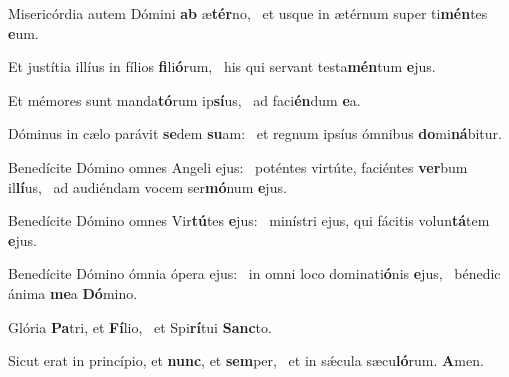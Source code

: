 \item Misericórdia autem Dómini \textbf{ab} æ\textbf{tér}no,~\psstar{} et usque in ætérnum super ti\textbf{mén}tes \textbf{e}um.
\item Et justítia illíus in fílios \textbf{fi}li\textbf{ó}rum,~\psstar{} his qui servant testa\textbf{mén}tum \textbf{e}jus.
\item Et mémores sunt manda\textbf{tó}rum ip\textbf{sí}us,~\psstar{} ad faci\textbf{én}dum \textbf{e}a.
\item Dóminus in cælo parávit \textbf{se}dem \textbf{su}am:~\psstar{} et regnum ipsíus ómnibus \textbf{do}mi\textbf{ná}bitur.
\item Benedícite Dómino omnes Angeli ejus:~\pscross{} poténtes virtúte, faciéntes \textbf{ver}bum il\textbf{lí}us,~\psstar{} ad audiéndam vocem ser\textbf{mó}num \textbf{e}jus.
\item Benedícite Dómino omnes Vir\textbf{tú}tes \textbf{e}jus:~\psstar{} minístri ejus, qui fácitis volun\textbf{tá}tem \textbf{e}jus.
\item Benedícite Dómino ómnia ópera ejus:~\pscross{} in omni loco dominati\textbf{ó}nis \textbf{e}jus,~\psstar{} bénedic ánima \textbf{me}a \textbf{Dó}mino.
\item Glória \textbf{Pa}tri, et \textbf{Fí}lio,~\psstar{} et Spi\textbf{rí}tui \textbf{Sanc}to.
\item Sicut erat in princípio, et \textbf{nunc}, et \textbf{sem}per,~\psstar{} et in sǽcula sæcu\textbf{ló}rum. \textbf{A}men.
